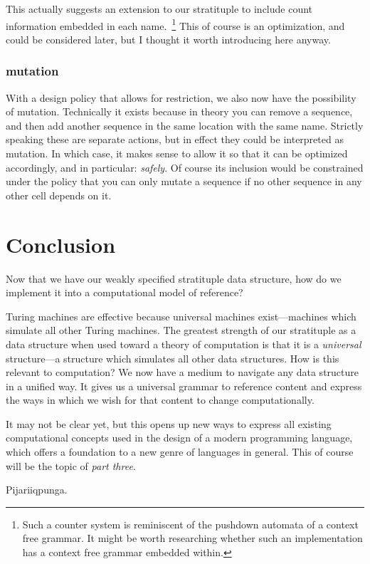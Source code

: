 \documentclass[twoside]{article}
\begin{document}
This actually suggests an extension to our stratituple to include count information embedded in each
name.\ \footnote{Such a counter system is reminiscent of the pushdown automata of a context free grammar.
It might be worth researching whether such an implementation has a context free grammar embedded within.}
This of course is an optimization, and could be considered later, but I thought it worth introducing here anyway.

\subsubsection*{mutation}

With a design policy that allows for restriction, we also now have the possibility of mutation. Technically
it exists because in theory you can remove a sequence, and then add another sequence in the same location
with the same name. Strictly speaking these are separate actions, but in effect they could be interpreted
as mutation. In which case, it makes sense to allow it so that it can be optimized accordingly, and in
particular: \emph{safely}. Of course its inclusion would be constrained under the policy that you can
only mutate a sequence if no other sequence in any other cell depends on it.

\section*{Conclusion}

Now that we have our weakly specified stratituple data structure, how do we implement it into a computational model of reference?

Turing machines are effective because universal machines exist---machines which simulate all other Turing machines.
The greatest strength of our stratituple as a data structure when used toward a theory of computation is that it is
a \emph{universal} structure---a structure which simulates all other data structures. How is this relevant to computation?
We now have a medium to navigate any data structure in a unified way. It gives us a universal grammar to reference
content and express the ways in which we wish for that content to change computationally.

It may not be clear yet, but this opens up new ways to express all existing computational concepts used
in the design of a modern programming language, which offers a foundation to a new genre of languages in general.
This of course will be the topic of \emph{part three}.

Pijariiqpunga.
\end{document}
